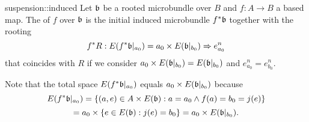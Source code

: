 \begin{mydefinition}{suspension::induced}{}
    Let $\mathfrak{b}$ be a rooted microbundle over $B$ and $f: A \to B$ a based map.
    The  of $f$ over $\mathfrak{b}$
    is the initial induced microbundle $f^*\mathfrak{b}$ together with the rooting
    \[
        f^*R: E(f^*\mathfrak{b}\vert_{a_0})
        = a_0 \times E(\mathfrak{b}\vert_{b_0}) \Rightarrow{} e^n_{a_0}
    \]
    that coincides with $R$ if we consider
    $a_0 \times E(\mathfrak{b}\vert_{b_0}) = E(\mathfrak{b}\vert_{b_0})$ and $e^n_{a_0} = e^n_{b_0}$.
\end{mydefinition}

\begin{myparagraph}
    Note that the total space $E(f^*\mathfrak{b}\vert_{a_0})$ equals $a_0 \times E(\mathfrak{b}\vert_{b_0})$ because
    \[
        E(f^*\mathfrak{b}\vert_{a_0})
        = \{(a, e) \in A \times E(\mathfrak{b}):a = a_0 \land f(a) = b_0 = j(e)\}
    \]
    \[
        = a_0 \times \{e \in E(\mathfrak{b}):j(e) = b_0\}
        = a_0 \times E(\mathfrak{b}\vert_{b_0}).
    \]
\end{myparagraph}